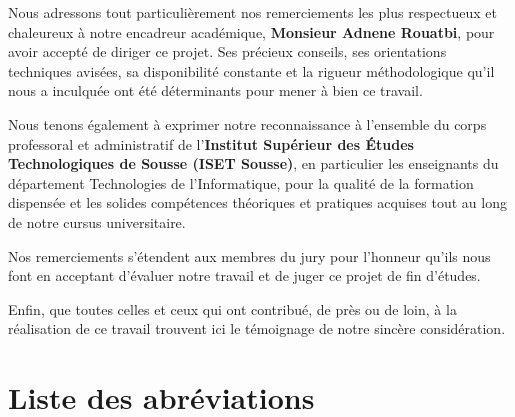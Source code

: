 \documentclass[12pt,a4paper,oneside]{report}
\begin{document}
Nous adressons tout particulièrement nos remerciements les plus respectueux et chaleureux à notre encadreur académique, \textbf{Monsieur Adnene Rouatbi}, pour avoir accepté de diriger ce projet. Ses précieux conseils, ses orientations techniques avisées, sa disponibilité constante et la rigueur méthodologique qu'il nous a inculquée ont été déterminants pour mener à bien ce travail.

Nous tenons également à exprimer notre reconnaissance à l'ensemble du corps professoral et administratif de l'\textbf{Institut Supérieur des Études Technologiques de Sousse (ISET Sousse)}, en particulier les enseignants du département Technologies de l'Informatique, pour la qualité de la formation dispensée et les solides compétences théoriques et pratiques acquises tout au long de notre cursus universitaire.

Nos remerciements s'étendent aux membres du jury pour l'honneur qu'ils nous font en acceptant d'évaluer notre travail et de juger ce projet de fin d'études.

Enfin, que toutes celles et ceux qui ont contribué, de près ou de loin, à la réalisation de ce travail trouvent ici le témoignage de notre sincère considération.

\clearpage

\chapter*{Liste des abréviations}
\end{document}

